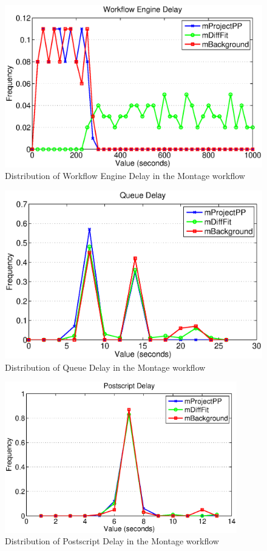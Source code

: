 \begin{figure}[h!]
	\centering
    \includegraphics[height=0.5\textwidth]{figures/model/workflow_engine_delay.eps}
    \caption{Distribution of Workflow Engine Delay in the Montage workflow}
    \label{fig:model_montage_engine_delay}
\end{figure}

\begin{figure}[h!]
	\centering
\includegraphics[height=0.5\textwidth]{figures/model/queue_delay.eps}
    \caption{Distribution of Queue Delay in the Montage workflow}
    \label{fig:model_montage_queue_delay}
\end{figure}

\begin{figure}[h!]
	\centering
\includegraphics[width=0.9\textwidth]{figures/model/postscript_delay.eps}
    \caption{Distribution of Postscript Delay in the Montage workflow}
    \label{fig:model_montage_postscript_delay}
\end{figure}

